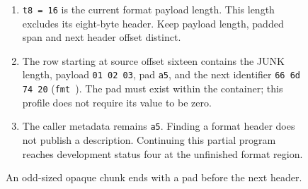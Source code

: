 \begin{figure}[htbp]
\begin{minipage}{\linewidth}
\begin{enumerate}
      \item \texttt{t8 = 16} is the current format payload length. This length excludes its eight-byte header. Keep payload length, padded span and next header offset distinct.
      \item The row starting at source offset sixteen contains the JUNK length, payload \texttt{01 02 03}, pad \texttt{a5}, and the next identifier \texttt{66 6d 74 20} (\texttt{fmt }). The pad must exist within the container; this profile does not require its value to be zero.
      \item The caller metadata remains \texttt{a5}. Finding a format header does not publish a description. Continuing this partial program reaches development status four at the unfinished format region.
    \end{enumerate}
  \end{minipage}
  \caption{An odd-sized opaque chunk ends with a pad before the next header.}
  \label{capture:031-pcm-wav-f02}
  \label{pcm-wav-f02}
\end{figure}
\par
